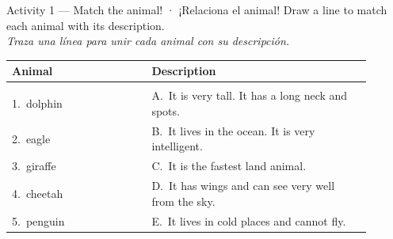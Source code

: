\vspace{10pt}

\begin{activity}{Activity 1 — Match the animal! · ¡Relaciona el animal!}
Draw a line to match each animal with its description. \\
\textit{Traza una línea para unir cada animal con su descripción.}

\bigskip
\begin{center}
\begin{tabular}{p{0.35\linewidth}@{\hfill}p{0.55\linewidth}}
\textbf{Animal} & \textbf{Description} \\[6pt]
\hline\\[-4pt]
1.\ dolphin   & A.\ It is very tall. It has a long neck and spots.  \\[4pt]
2.\ eagle     & B.\ It lives in the ocean. It is very intelligent.  \\[4pt]
3.\ giraffe   & C.\ It is the fastest land animal.                  \\[4pt]
4.\ cheetah   & D.\ It has wings and can see very well from the sky. \\[4pt]
5.\ penguin   & E.\ It lives in cold places and cannot fly.          \\
\end{tabular}
\end{center}
\end{activity}
